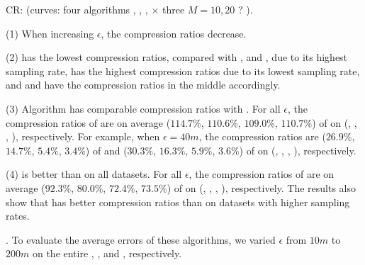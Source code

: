 CR: (\textcolor[rgb]{0.00,0.07,1.00}{curves: four algorithms \cist, \cista, \dpa, \squishe  $\times$  three $M = 10, {20}$ ? }).

\ni (1) When increasing $\epsilon$, the compression ratios decrease.


\ni (2) \pricar has the lowest compression ratios, compared with \truck, \sercar and \geolife, due to its highest sampling rate,
\truck has the highest compression ratios due to its lowest sampling rate, and \sercar and \geolife have the compression ratios in the middle accordingly.

\ni (3) Algorithm \cist has \textcolor[rgb]{1.00,0.00,0.00}{comparable} compression ratios with \dpa.
For all $\epsilon$, the compression ratios of \cist are on average ($114.7\%$, $110.6\%$, $109.0\%$, $110.7\%$) of \dpa on (\truck, \sercar, \geolife, \pricar), respectively.
For example, when $\epsilon = 40m$, the compression ratios are ($26.9\%$, $14.7\%$, $5.4\%$, $3.4\%$) of \dpa and ($30.3\%$, $16.3\%$, $5.9\%$, $3.6\%$) of \cist on (\truck, \sercar, \geolife, \pricar), respectively.

\ni (4) \cist is better than  \squishe on all datasets.
For all $\epsilon$, the compression ratios of \cist are on average ($92.3\%$, $80.0\%$, $72.4\%$, {$73.5\%$}) of \squishe on (\truck, \sercar, \geolife, \pricar), respectively.
The results also show that \cist has better compression ratios than \squishe on datasets with higher sampling rates.




.
To evaluate the average errors of these algorithms, we varied $\epsilon$ from $10m$ to $200m$ on the entire \truck, \sercar, \geolife and \pricar, respectively.

